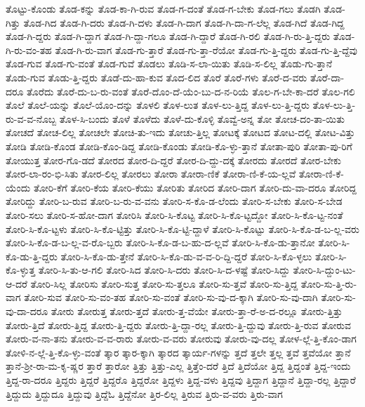 {ತೊಟ್ಟು-ಕೊಂಡು
ತೊಡ-ಕನ್ನು
ತೊಡ-ಕಾ-ಗಿ-ರುವ
ತೊಡ-ಗ-ದಂತೆ
ತೊಡ-ಗ-ಬೇಕು
ತೊಡ-ಗಲು
ತೊಡಗಿ
ತೊಡ-ಗಿತ್ತು
ತೊಡ-ಗಿದ
ತೊಡ-ಗಿ-ದರು
ತೊಡ-ಗಿ-ದಳು
ತೊಡ-ಗಿ-ದಾಗ
ತೊಡ-ಗಿ-ದಾ-ಗ-ಲೆಲ್ಲ
ತೊಡ-ಗಿದೆ
ತೊಡ-ಗಿದ್ದ
ತೊಡ-ಗಿ-ದ್ದರು
ತೊಡ-ಗಿ-ದ್ದಾಗ
ತೊಡ-ಗಿ-ದ್ದಾ-ಗಲೂ
ತೊಡ-ಗಿ-ದ್ದಾರೆ
ತೊಡ-ಗಿ-ರಲಿ
ತೊಡ-ಗಿ-ರು-ತ್ತಿ-ದ್ದರು
ತೊಡ-ಗಿ-ರು-ವಂ-ತಹ
ತೊಡ-ಗಿ-ರು-ವಾಗ
ತೊಡ-ಗು-ತ್ತಾರೆ
ತೊಡ-ಗು-ತ್ತಾ-ರೆಯೋ
ತೊಡ-ಗು-ತ್ತಿ-ದ್ದರು
ತೊಡ-ಗು-ತ್ತಿ-ದ್ದೆವು
ತೊಡ-ಗುವ
ತೊಡ-ಗು-ವಂತೆ
ತೊಡ-ಗುವೆ
ತೊಡಲು
ತೊಡಿ-ಸ-ಲಾ-ಯಿತು
ತೊಡಿ-ಸ-ಲಿಲ್ಲ
ತೊಡು-ಗು-ತ್ತಾನೆ
ತೊಡು-ಗುವ
ತೊಡು-ತ್ತಿ-ದ್ದರು
ತೊಡೆ-ದು-ಹಾ-ಕುವ
ತೊದ-ಲಿದ
ತೊರೆ
ತೊರೆ-ಗಳು
ತೊರೆ-ದ-ವರು
ತೊರೆ-ದಾ-ದರೂ
ತೊರೆದು
ತೊರೆ-ದು-ಬ-ರು-ವಂತೆ
ತೊರೆ-ದೊಂ-ದೆ-ಯೆಂ-ಬು-ದ-ನ-ರಿಯೆ
ತೊಲ-ಗ-ಬೇ-ಕಾ-ದರೆ
ತೊಲ-ಗಲಿ
ತೊಲೆ
ತೊಲೆ-ಯನ್ನು
ತೊಲೆ-ಯೊಂ-ದನ್ನು
ತೊಳಲಿ
ತೊಳ-ಲುತ
ತೊಳ-ಲು-ತ್ತಿದ್ದ
ತೊಳ-ಲು-ತ್ತಿ-ದ್ದರು
ತೊಳ-ಲು-ತ್ತಿ-ರು-ವ-ವ-ನೊಬ್ಬ
ತೊಳ-ಸಿ-ಬಂದು
ತೊಳೆ
ತೊಳೆದು
ತೊಳೆ-ದು-ಕೊಳ್ಳಿ
ತೊವ್ವೆ-ಅನ್ನ
ತೋ
ತೋಚ-ದಂ-ತಾ-ಯಿತು
ತೋಚದೆ
ತೋಚ-ಲಿಲ್ಲ
ತೋಚಲೇ
ತೋಚಿ-ತು-ಇದು
ತೋಚು-ತ್ತಿಲ್ಲ
ತೋಟಕ್ಕೆ
ತೋಟದ
ತೋಟ-ದಲ್ಲಿ
ತೋಟ-ವಿತ್ತು
ತೋಡಿ
ತೋಡಿ-ಕೊಂಡ
ತೋಡಿ-ಕೊಂ-ಡಿದ್ದ
ತೋಡಿ-ಕೊಂಡು
ತೋಡಿ-ಕೊ-ಳ್ಳು-ತ್ತಾನೆ
ತೋತಾ-ಪುರಿ
ತೋತಾ-ಪು-ರಿಗೆ
ತೋಯುತ್ತ
ತೋರ-ಗೊ-ಡದೆ
ತೋರದ
ತೋರ-ದಿ-ದ್ದರೆ
ತೋರ-ದಿ-ದ್ದು-ದಕ್ಕೆ
ತೋರದು
ತೋರದೆ
ತೋರ-ಬೇಕು
ತೋರ-ಲಾ-ರಂ-ಭಿ-ಸಿತು
ತೋರ-ಲಿಲ್ಲ
ತೋರಲು
ತೋರಾ
ತೋರಾ-ಣಿಕೆ
ತೋರಾ-ಣಿ-ಕೆ-ಯ-ಲ್ಲವೆ
ತೋರಾ-ಣಿ-ಕೆ-ಯೆಂದು
ತೋರಿ-ಕೆಗೆ
ತೋರಿ-ಕೆಯ
ತೋರಿ-ಕೆಯು
ತೋರಿತು
ತೋರಿದ
ತೋರಿ-ದಾಗ
ತೋರಿ-ದು-ವಾ-ದರೂ
ತೋರಿದ್ದ
ತೋರಿದ್ದು
ತೋರಿ-ಬ-ರುವ
ತೋರಿ-ಬ-ರು-ವ-ವನು
ತೋರಿ-ಸ-ಕೊ-ಡ-ಲೆಂದು
ತೋರಿ-ಸ-ಬೇಕು
ತೋರಿ-ಸ-ಬೇಡ
ತೋರಿ-ಸಲು
ತೋರಿ-ಸ-ಹೋ-ದಾಗ
ತೋರಿಸಿ
ತೋರಿ-ಸಿ-ಕೊಟ್ಟ
ತೋರಿ-ಸಿ-ಕೊ-ಟ್ಟದ್ದೋ
ತೋರಿ-ಸಿ-ಕೊ-ಟ್ಟ-ನಂತೆ
ತೋರಿ-ಸಿ-ಕೊ-ಟ್ಟಳು
ತೋರಿ-ಸಿ-ಕೊ-ಟ್ಟಿತ್ತು
ತೋರಿ-ಸಿ-ಕೊ-ಟ್ಟಿ-ದ್ದಾಳೆ
ತೋರಿ-ಸಿ-ಕೊಟ್ಟು
ತೋರಿ-ಸಿ-ಕೊ-ಡ-ಬ-ಲ್ಲ-ವರು
ತೋರಿ-ಸಿ-ಕೊ-ಡ-ಬ-ಲ್ಲ-ವ-ರೊ-ಬ್ಬರು
ತೋರಿ-ಸಿ-ಕೊ-ಡ-ಬ-ಹು-ದ-ಲ್ಲವೆ
ತೋರಿ-ಸಿ-ಕೊ-ಡು-ತ್ತಾನೋ
ತೋರಿ-ಸಿ-ಕೊ-ಡು-ತ್ತಿ-ದ್ದರು
ತೋರಿ-ಸಿ-ಕೊ-ಡು-ತ್ತೇನೆ
ತೋರಿ-ಸಿ-ಕೊ-ಡು-ವ-ವ-ರಿ-ದ್ದಿ-ದ್ದರೆ
ತೋರಿ-ಸಿ-ಕೊ-ಳ್ಳಲು
ತೋರಿ-ಸಿ-ಕೊ-ಳ್ಳುತ್ತ
ತೋರಿ-ಸಿ-ತು-ಆ-ಗಲಿ
ತೋರಿ-ಸಿದ
ತೋರಿ-ಸಿ-ದರು
ತೋರಿ-ಸಿ-ದ-ಳಷ್ಟೆ
ತೋರಿ-ಸಿದ್ದು
ತೋರಿ-ಸಿ-ದ್ದುಂ-ಟು-ಆ-ದರೆ
ತೋರಿ-ಸಿಲ್ಲ
ತೋರಿಸು
ತೋರಿ-ಸುತ್ತ
ತೋರಿ-ಸು-ತ್ತಲೂ
ತೋರಿ-ಸು-ತ್ತವೆ
ತೋರಿ-ಸು-ತ್ತಿದ್ದ
ತೋರಿ-ಸು-ತ್ತಿ-ರು-ವಾಗ
ತೋರಿ-ಸುವ
ತೋರಿ-ಸು-ವಂ-ತಹ
ತೋರಿ-ಸು-ವಂತೆ
ತೋರಿ-ಸು-ವು-ದ-ಕ್ಕಾಗಿ
ತೋರಿ-ಸು-ವು-ದಾಗಿ
ತೋರಿ-ಸು-ವು-ದಾ-ದರೂ
ತೋರು
ತೋರುತ್ತ
ತೋರು-ತ್ತದೆ
ತೋರು-ತ್ತ-ವೆಯೇ
ತೋರು-ತ್ತಾ-ರೆ-ಅ-ದ-ರಲ್ಲೂ
ತೋರು-ತ್ತಿತ್ತು
ತೋರು-ತ್ತಿದೆ
ತೋರು-ತ್ತಿದ್ದ
ತೋರು-ತ್ತಿ-ದ್ದರು
ತೋರು-ತ್ತಿ-ದ್ದಾ-ರಲ್ಲ
ತೋರು-ತ್ತಿ-ದ್ದುವು
ತೋರು-ತ್ತಿ-ರುವ
ತೋರುವ
ತೋರು-ವ-ನಾ-ತನು
ತೋರು-ವ-ವ-ರಾರು
ತೋರು-ವ-ವರು
ತೋರುವು
ತೋರು-ವು-ದಲ್ಲ
ತೋಳ-ಲ್ಲೆ-ತ್ತಿ-ಕೊಂ-ಡಾಗ
ತೋಳಿ-ನ-ಲ್ಲೆ-ತ್ತಿ-ಕೊ-ಳ್ಳು-ವಂತೆ
ತ್ಕಾರ
ತ್ಕಾರ-ಕ್ಕಾಗಿ
ತ್ಕಾರದ
ತ್ಕಾರ್ಯ-ಗಳನ್ನು
ತ್ತದೆ
ತ್ತಲೇ
ತ್ತಲ್ಲ
ತ್ತವೆ
ತ್ತವೆಯೋ
ತ್ತಾನೆ
ತ್ತಾನೆ-ಶ್ರೀ-ರಾ-ಮ-ಕೃ-ಷ್ಣರ
ತ್ತಾರೆ
ತ್ತಾರೋ
ತ್ತಿತ್ತು
ತ್ತಿತ್ತು-ಎಲ್ಲ
ತ್ತಿತ್ತೆಂ-ದರೆ
ತ್ತಿದೆ
ತ್ತಿದೆಯೋ
ತ್ತಿದ್ದ
ತ್ತಿದ್ದಂತೆ
ತ್ತಿದ್ದ-ಇಂದು
ತ್ತಿದ್ದ-ರಾ-ದರೂ
ತ್ತಿದ್ದರು
ತ್ತಿದ್ದರೆ
ತ್ತಿದ್ದರೊ
ತ್ತಿದ್ದರೋ
ತ್ತಿದ್ದಳು
ತ್ತಿದ್ದ-ವಳು
ತ್ತಿದ್ದವು
ತ್ತಿದ್ದಾಗ
ತ್ತಿದ್ದಾನೆ
ತ್ತಿದ್ದಾ-ರಲ್ಲ
ತ್ತಿದ್ದಾರೆ
ತ್ತಿದ್ದುದು
ತ್ತಿದ್ದುದೂ
ತ್ತಿದ್ದುವು
ತ್ತಿದ್ದೆಓ
ತ್ತಿದ್ದೆನೋ
ತ್ತಿರ-ಲಿಲ್ಲ
ತ್ತಿರುವ
ತ್ತಿರು-ವ-ವರು
ತ್ತಿರು-ವಾಗ
}
